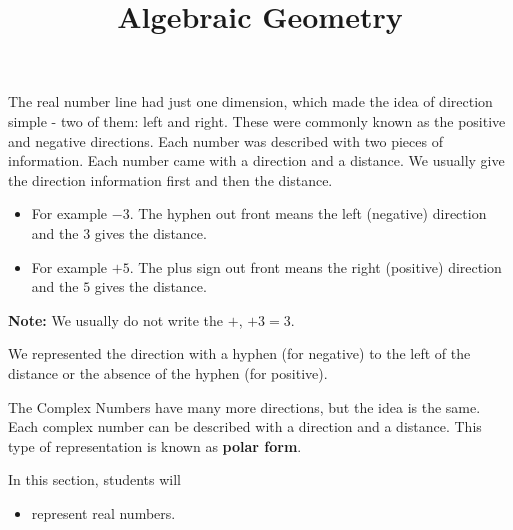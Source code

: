 \documentclass{ximera}
\title{Algebraic Geometry}
\begin{document}
\begin{abstract}
\end{abstract}
\maketitle





The real number line had just one dimension, which made the idea of direction simple - two of them: left and right.  These were commonly known as the positive and negative directions.  Each number was described with two pieces of information.  Each number came with a direction and a distance.  We usually give the direction information first and then the distance.


\begin{itemize}
\item For example $-3$.  The hyphen out front means the left (negative) direction and the $3$ gives the distance.
\item For example $+5$.  The plus sign out front means the right (positive) direction and the $5$ gives the distance.
\end{itemize}
\textbf{Note:} We usually do not write the $+$, $+3 = 3$.

We represented the direction with a hyphen (for negative) to the left of the distance or the absence of the hyphen (for positive).

The Complex Numbers have many more directions, but the idea is the same.  Each complex number can be described with a direction and a distance.  This type of representation is known as \textbf{polar form}.






\begin{sectionOutcomes}
In this section, students will 

\begin{itemize}
\item represent real numbers.
\end{itemize}
\end{sectionOutcomes}
\end{document}
